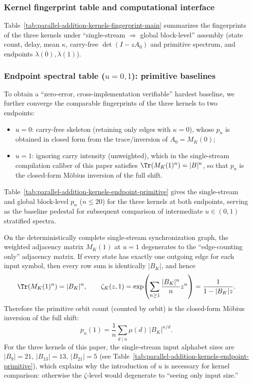 \subsubsection{Kernel fingerprint table and computational interface}
Table~\ref{tab:parallel-addition-kernels-fingerprint-main} summarizes the fingerprints of the three kernels under ``single-stream $\Rightarrow$ global block-level'' assembly (state count, delay, mean $\kappa$, carry-free $\det(I-zA_0)$ and primitive spectrum, and endpoints $\lambda(0),\lambda(1)$).


\subsubsection{Endpoint spectral table (\texorpdfstring{$u=0,1$}{u=0,1}): primitive baselines}\label{subsec:kernel-endpoint-primitive}
To obtain a ``zero-error, cross-implementation verifiable'' hardest baseline, we further converge the comparable fingerprints of the three kernels to two endpoints:
\begin{itemize}
  \item $u=0$: carry-free skeleton (retaining only edges with $\kappa=0$), whose $p_n$ is obtained in closed form from the trace/inversion of $A_0=M_K(0)$;
  \item $u=1$: ignoring carry intensity (unweighted), which in the single-stream compilation caliber of this paper satisfies $\Tr(M_K(1)^n)=|B|^n$, so that $p_n$ is the closed-form M\"obius inversion of the full shift.
\end{itemize}
Table~\ref{tab:parallel-addition-kernels-endpoint-primitive} gives the single-stream and global block-level $p_n$ ($n\le 20$) for the three kernels at both endpoints, serving as the baseline pedestal for subsequent comparison of intermediate $u\in(0,1)$ stratified spectra.


\begin{corollary}[Degeneracy at \texorpdfstring{$u=1$}{u=1}: the full shift baseline that only sees input size]\label{cor:par-add-u1-degeneracy}
On the deterministically complete single-stream synchronization graph, the weighted adjacency matrix $M_K(1)$ at $u=1$ degenerates to the ``edge-counting only'' adjacency matrix. If every state has exactly one outgoing edge for each input symbol, then every row sum is identically $|B_K|$, and hence
\[
\Tr(M_K(1)^n)=|B_K|^n,\qquad
\zeta_K(z,1)=\exp\!\left(\sum_{n\ge 1}\frac{|B_K|^n}{n}z^n\right)=\frac{1}{1-|B_K|z}.
\]
Therefore the primitive orbit count (counted by orbit) is the closed-form M\"obius inversion of the full shift:
\[
p_n(1)=\frac{1}{n}\sum_{d\mid n}\mu(d)\,|B_K|^{n/d}.
\]
For the three kernels of this paper, the single-stream input alphabet sizes are
\(
|B_9|=21,\ |B_{13}|=13,\ |B_{21}|=5
\)
(see Table~\ref{tab:parallel-addition-kernels-endpoint-primitive}), which explains why the introduction of $u$ is necessary for kernel comparison: otherwise the $\zeta$-level would degenerate to ``seeing only input size.''
\end{corollary}

